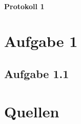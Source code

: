 \newpage

\paragraph{\LARGE Protokoll 1}

\section{Aufgabe 1}

	\subsection{Aufgabe 1.1}
	
\section{Quellen}
